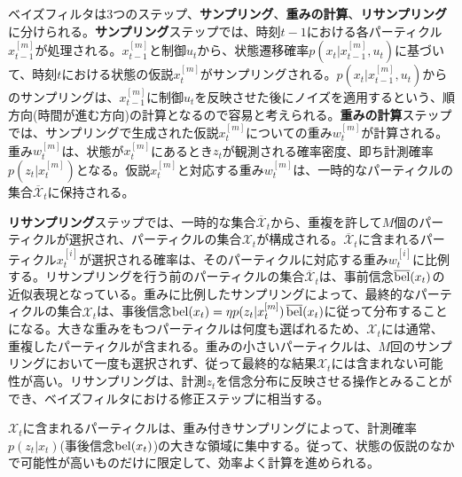 \documentclass[dvipdfmx,a4paper]{jsarticle}
\begin{document}
ベイズフィルタは3つのステップ、\textbf{サンプリング}、\textbf{重みの計算}、\textbf{リサンプリング}に分けられる。\textbf{サンプリング}ステップでは、時刻$t - 1$における各パーティクル$x_{t - 1}^{[m]}$が処理される。$x_{t - 1}^{[m]}$と制御$u_t$から、状態遷移確率$p(x_t | x_{t - 1}^{[m]}, u_t)$に基づいて、時刻$t$における状態の仮説$x_t^{[m]}$がサンプリングされる。$p(x_t | x_{t - 1}^{[m]}, u_t)$からのサンプリングは、$x_{t - 1}^{[m]}$に制御$u_t$を反映させた後にノイズを適用するという、順方向(時間が進む方向)の計算となるので容易と考えられる。\textbf{重みの計算}ステップでは、サンプリングで生成された仮説$x_t^{[m]}$についての重み$w_t^{[m]}$が計算される。重み$w_t^{[m]}$は、状態が$x_t^{[m]}$にあるとき$z_t$が観測される確率密度、即ち計測確率$p(z_t | x_t^{[m]})$となる。仮説$x_t^{[m]}$と対応する重み$w_t^{[m]}$は、一時的なパーティクルの集合$\overline{\mathcal{X}}_t$に保持される。\newline

\textbf{リサンプリング}ステップでは、一時的な集合$\overline{\mathcal{X}}_t$から、重複を許して$M$個のパーティクルが選択され、パーティクルの集合$\mathcal{X}_t$が構成される。$\overline{\mathcal{X}}_t$に含まれるパーティクル$x_t^{[i]}$が選択される確率は、そのパーティクルに対応する重み$w_t^{[i]}$に比例する。リサンプリングを行う前のパーティクルの集合$\overline{\mathcal{X}}_t$は、事前信念$\operatorname{\overline{bel}}(x_t)$の近似表現となっている。重みに比例したサンプリングによって、最終的なパーティクルの集合$\mathcal{X}_t$は、事後信念$\operatorname{bel}(x_t) = \eta p(z_t | x_t^{[m]}) \operatorname{\overline{bel}}(x_t)$に従って分布することになる。大きな重みをもつパーティクルは何度も選ばれるため、$\mathcal{X}_t$には通常、重複したパーティクルが含まれる。重みの小さいパーティクルは、$M$回のサンプリングにおいて一度も選択されず、従って最終的な結果$\mathcal{X}_t$には含まれない可能性が高い。リサンプリングは、計測$z_t$を信念分布に反映させる操作とみることができ、ベイズフィルタにおける修正ステップに相当する。\newline

$\mathcal{X}_t$に含まれるパーティクルは、重み付きサンプリングによって、計測確率$p(z_t | x_t)$(事後信念$\operatorname{bel}(x_t)$)の大きな領域に集中する。従って、状態の仮説のなかで可能性が高いものだけに限定して、効率よく計算を進められる。
\end{document}
